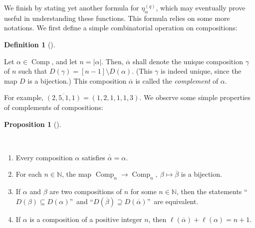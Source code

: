 \documentclass[numbers=enddot,12pt,final,onecolumn,notitlepage]{scrartcl}%
\theoremstyle{definition}
\newtheorem{prop}[theo]{Proposition}
\newenvironment{proposition}[1][]
{\begin{prop}[#1]\begin{leftbar}}
{\end{leftbar}\end{prop}}
\newtheorem{defi}[theo]{Definition}
\newenvironment{definition}[1][]
{\begin{defi}[#1]\begin{leftbar}}
{\end{leftbar}\end{defi}}
\begin{document}
We finish by stating yet another formula for $\eta_{\alpha}^{\left(  q\right)
}$, which may eventually prove useful in understanding these functions. This
formula relies on some more notations. We first define a simple combinatorial
operation on compositions:

\begin{definition}
\label{def.composition-complement}Let $\alpha\in\operatorname*{Comp}$, and let
$n=\left\vert \alpha\right\vert $. Then, $\overline{\alpha}$ shall denote the
unique composition $\gamma$ of $n$ such that $D\left(  \gamma\right)  =\left[
n-1\right]  \setminus D\left(  \alpha\right)  $. (This $\gamma$ is indeed
unique, since the map $D$ is a bijection.) This composition $\overline{\alpha
}$ is called the \emph{complement} of $\alpha$.
\end{definition}

For example, $\overline{\left(  2,5,1,1\right)  }=\left(  1,2,1,1,1,3\right)
$. We observe some simple properties of complements of compositions:

\begin{proposition}
\label{prop.composition-complement.basics}\ \ 

\begin{enumerate}
\item[\textbf{(a)}] Every composition $\alpha$ satisfies $\overline
{\overline{\alpha}}=\alpha$.

\item[\textbf{(b)}] For each $n\in\mathbb{N}$, the map $\operatorname*{Comp}%
\nolimits_{n}\rightarrow\operatorname*{Comp}\nolimits_{n},\ \beta
\mapsto\overline{\beta}$ is a bijection.

\item[\textbf{(c)}] If $\alpha$ and $\beta$ are two compositions of $n$ for
some $n\in\mathbb{N}$, then the statements \textquotedblleft$D\left(
\beta\right)  \subseteq D\left(  \alpha\right)  $\textquotedblright\ and
\textquotedblleft$D\left(  \overline{\beta}\right)  \supseteq D\left(
\overline{\alpha}\right)  $\textquotedblright\ are equivalent.

\item[\textbf{(d)}] If $\alpha$ is a composition of a positive integer $n$,
then $\ell\left(  \overline{\alpha}\right)  +\ell\left(  \alpha\right)  =n+1$.
\end{enumerate}
\end{proposition}
\end{document}
